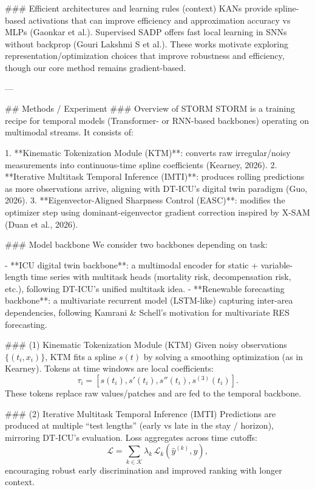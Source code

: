 ### Efficient architectures and learning rules (context)  
KANs provide spline-based activations that can improve efficiency and approximation accuracy vs MLPs (Gaonkar et al.). Supervised SADP offers fast local learning in SNNs without backprop (Gouri Lakshmi S et al.). These works motivate exploring representation/optimization choices that improve robustness and efficiency, though our core method remains gradient-based.

---

## Methods / Experiment  
### Overview of STORM  
STORM is a training recipe for temporal models (Transformer- or RNN-based backbones) operating on multimodal streams. It consists of:

1. **Kinematic Tokenization Module (KTM)**: converts raw irregular/noisy measurements into continuous-time spline coefficients (Kearney, 2026).  
2. **Iterative Multitask Temporal Inference (IMTI)**: produces rolling predictions as more observations arrive, aligning with DT-ICU’s digital twin paradigm (Guo, 2026).  
3. **Eigenvector-Aligned Sharpness Control (EASC)**: modifies the optimizer step using dominant-eigenvector gradient correction inspired by X-SAM (Duan et al., 2026).  

### Model backbone  
We consider two backbones depending on task:

- **ICU digital twin backbone**: a multimodal encoder for static + variable-length time series with multitask heads (mortality risk, decompensation risk, etc.), following DT-ICU’s unified multitask idea.  
- **Renewable forecasting backbone**: a multivariate recurrent model (LSTM-like) capturing inter-area dependencies, following Kamrani & Schell’s motivation for multivariate RES forecasting.

### (1) Kinematic Tokenization Module (KTM)  
Given noisy observations \(\{(t_i, x_i)\}\), KTM fits a spline \(s(t)\) by solving a smoothing optimization (as in Kearney). Tokens at time windows are local coefficients:
\[
\tau_i = [s(t_i), s'(t_i), s''(t_i), s^{(3)}(t_i)].
\]
These tokens replace raw values/patches and are fed to the temporal backbone.

### (2) Iterative Multitask Temporal Inference (IMTI)  
Predictions are produced at multiple “test lengths” (early vs late in the stay / horizon), mirroring DT-ICU’s evaluation. Loss aggregates across time cutoffs:
\[
\mathcal{L} = \sum_{k \in \mathcal{K}} \lambda_k \, \mathcal{L}_k(\hat{y}^{(k)}, y),
\]
encouraging robust early discrimination and improved ranking with longer context.

